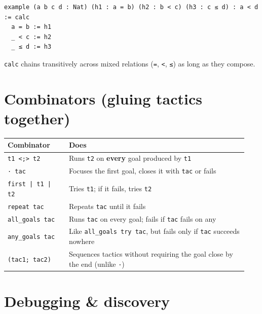 \begin{verbatim}
example (a b c d : Nat) (h1 : a = b) (h2 : b < c) (h3 : c ≤ d) : a < d := calc
  a = b := h1
  _ < c := h2
  _ ≤ d := h3
\end{verbatim}

\texttt{calc} chains transitively across mixed relations (\texttt{=}, \texttt{<}, \texttt{≤}) as long as they compose.

\section{Combinators (gluing tactics together)}

\begin{center}
\begin{tabular}{@{}p{0.24\linewidth}p{0.70\linewidth}@{}}
\hline
\textbf{Combinator} & \textbf{Does} \\
\hline
\texttt{t1 <;> t2} & Runs \texttt{t2} on \textbf{every} goal produced by \texttt{t1} \\
\texttt{· tac} & Focuses the first goal, closes it with \texttt{tac} or fails \\
\texttt{first | t1 | t2} & Tries \texttt{t1}; if it fails, tries \texttt{t2} \\
\texttt{repeat tac} & Repeats \texttt{tac} until it fails \\
\texttt{all\_goals tac} & Runs \texttt{tac} on every goal; fails if \texttt{tac} fails on any \\
\texttt{any\_goals tac} & Like \texttt{all\_goals try tac}, but fails only if \texttt{tac} succeeds nowhere \\
\texttt{(tac1; tac2)} & Sequences tactics without requiring the goal close by the end (unlike \texttt{·}) \\
\hline
\end{tabular}
\end{center}

\section{Debugging \& discovery}

